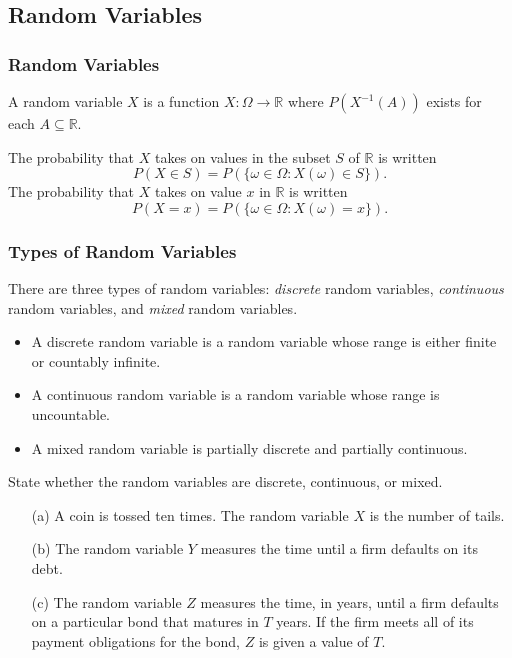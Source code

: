 \documentclass{beamer}
\begin{document}
\subsection{Random Variables} 

\begin{frame}
\frametitle{Random Variables}

\begin{Definition}
A random variable $X$ is a function $X:\Omega\to\mathbb{R}$ where $P\left(X^{-1}(A)\right)$ exists for each $A\subseteq\mathbb{R}$.
\end{Definition}

The probability that $X$ takes on values in the subset $S$ of $\mathbb{R}$ is written
$$
P(X\in S) = P\left(\{\omega \in\Omega : X(\omega)\in S\}\right).
$$
The probability that $X$ takes on value $x$ in $\mathbb{R}$ is written
$$
P(X = x) = P\left( \{\omega \in\Omega : X(\omega) = x\} \right).
$$
\end{frame}

\begin{frame}
\frametitle{Types of Random Variables}
There are three types of random variables: {\it discrete} random variables, {\it continuous} random variables, and {\it mixed} random variables. 
\begin{itemize}
\item A discrete random variable is a random variable whose range is either finite or countably infinite. 
\item A continuous random variable is a random variable whose range is uncountable.
\item A mixed random variable is partially discrete and partially continuous.
\end{itemize}

\end{frame}

\begin{frame}[t]
\begin{Example}
State whether the random variables are discrete, continuous, or mixed.
\begin{enumerate}
\item[(a)] A coin is tossed ten times. The random variable $X$ is the number of tails.
\item[(b)] The random variable $Y$ measures the time until a firm defaults on its debt.
\item[(c)] The random variable $Z$ measures the time, in years, until a firm defaults on a particular bond that matures in $T$ years. If the firm meets all of its payment obligations for the bond, $Z$ is given a value of $T$.
\end{enumerate}
\end{Example}

\end{frame}
\end{document}
